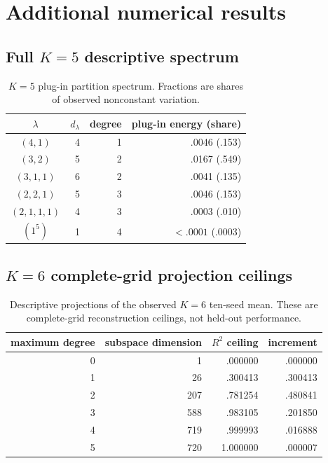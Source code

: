 \documentclass{article}
\begin{document}
\section{Additional numerical results}

\subsection{Full $K=5$ descriptive spectrum}

\begin{table}[h]
  \caption{$K=5$ plug-in partition spectrum. Fractions are shares of observed nonconstant variation.}
  \centering
  \small
  \begin{tabular}{@{}crrr@{}}
    \toprule
    $\lambda$ & $d_\lambda$ & degree & plug-in energy (share) \\
    \midrule
    $(4,1)$ & 4 & 1 & .0046 (.153) \\
    $(3,2)$ & 5 & 2 & .0167 (.549) \\
    $(3,1,1)$ & 6 & 2 & .0041 (.135) \\
    $(2,2,1)$ & 5 & 3 & .0046 (.153) \\
    $(2,1,1,1)$ & 4 & 3 & .0003 (.010) \\
    $(1^5)$ & 1 & 4 & $<.0001$ (.0003) \\
    \bottomrule
  \end{tabular}
\end{table}

\subsection{$K=6$ complete-grid projection ceilings}

\begin{table}[h]
  \caption{Descriptive projections of the observed $K=6$ ten-seed mean. These are complete-grid reconstruction ceilings, not held-out performance.}
  \centering
  \small
  \begin{tabular}{@{}rrrr@{}}
    \toprule
    maximum degree & subspace dimension & $R^2$ ceiling & increment \\
    \midrule
    0 & 1 & .000000 & .000000 \\
    1 & 26 & .300413 & .300413 \\
    2 & 207 & .781254 & .480841 \\
    3 & 588 & .983105 & .201850 \\
    4 & 719 & .999993 & .016888 \\
    5 & 720 & 1.000000 & .000007 \\
    \bottomrule
  \end{tabular}
\end{table}
\end{document}
